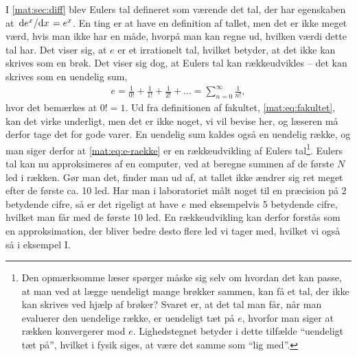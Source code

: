 \begin{example} \label{mat:ex:eulers_tal}%
I \cref{mat:sec:diff} blev Eulers tal defineret som værende det tal, der har egenskaben at $\dv*{e^x}{x} = e^x$. En ting er at have en definition af tallet, men det er ikke meget værd, hvis man ikke har en måde, hvorpå man kan regne ud, hvilken værdi dette tal har. Det viser sig, at $e$ er et irrationelt tal, hvilket betyder, at det ikke kan skrives som en brøk. Det viser sig dog, at Eulers tal kan rækkeudvikles -- det kan skrives som en uendelig sum,
%
\begin{align} \label{mat:eq:e-raekke}
    e = \frac{1}{0!} + \frac{1}{1!} + \frac{1}{2!} + \dots{} = \sum_{n=0}^\infty \frac{1}{n!},
\end{align}
%
hvor det bemærkes at $0! = 1$. Ud fra definitionen af fakultet, \cref{mat:eq:fakultet}, kan det virke underligt, men det er ikke noget, vi vil bevise her, og læseren må derfor tage det for gode varer. En uendelig sum kaldes også en uendelig række, og man siger derfor at \cref{mat:eq:e-raekke} er en rækkeudvikling af Eulers tal\footnote{Den opmærksomme læser spørger måske sig selv om hvordan det kan passe, at man ved at lægge uendeligt mange brøkker sammen, kan få et tal, der ikke kan skrives ved hjælp af brøker? Svaret er, at det tal man får, når man evaluerer den uendelige række, er uendeligt tæt på $e$, hvorfor man siger at rækken konvergerer mod $e$. Lighedstegnet betyder i dette tilfælde ``uendeligt tæt på'', hvilket i fysik siges, at være det samme som ``lig med''.\label{mat:fn:konvergens}}. Eulers tal kan nu approksimeres af en computer, ved at beregne summen af de første $N$ led i rækken. Gør man det, finder man ud af, at tallet ikke ændrer sig ret meget efter de første ca. 10 led. Har man i laboratoriet målt noget til en præcision på 2 betydende cifre, så er det rigeligt at have $e$ med eksempelvis 5 betydende cifre, hvilket man får med de første 10 led. En rækkeudvikling kan derfor forstås som en approksimation, der bliver bedre desto flere led vi tager med, hvilket vi også så i eksempel I.
\end{example}

